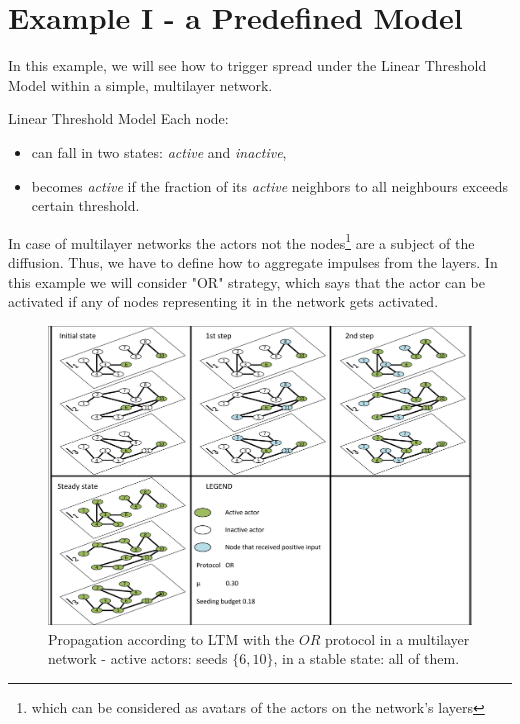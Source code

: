 \documentclass{beamer}
\begin{document}
\section{Example I - a Predefined Model}

\begin{frame}{\secname}
    In this example, we will see how to trigger spread under the Linear Threshold Model within a 
    simple, multilayer network.
    \begin{block}{Linear Threshold Model}
    Each node:
    \begin{itemize}
        \item can fall in two states: \textit{active} and \textit{inactive},
        \item becomes \textit{active} if the fraction of its \textit{active} neighbors to all neighbours
        exceeds certain threshold.
    \end{itemize}
    \end{block}
    In case of multilayer networks the actors not the nodes\footnote{which can be considered as avatars
    of the actors on the network's layers} are a subject of the diffusion. Thus, we have to define
    how to aggregate impulses from the layers. In this example we will consider "OR" strategy, which 
    says that the actor can be activated if any of nodes representing it in the network gets activated.
\end{frame}

\begin{frame}{\subsubsecname}
    \begin{figure}
        \centering
        \includegraphics[width=.75\textwidth]{figures/ltm_example_or.pdf}
        \caption{Propagation according to LTM with the $OR$ protocol in a multilayer network -
        active actors: seeds $\{6, 10\}$, in a stable state: all of them.}
    \end{figure}
\end{frame}
\end{document}
